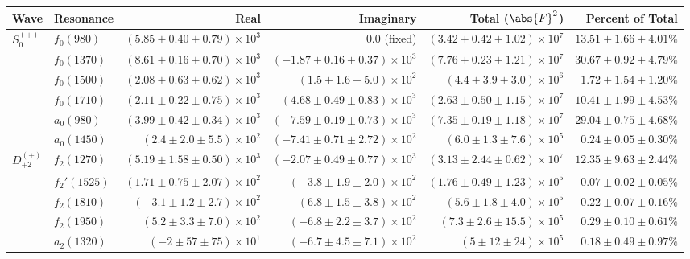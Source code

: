\begin{table}[ht]
    \begin{center}
        \begin{tabular}{llrrrr}\toprule
        Wave & Resonance & Real & Imaginary & Total ($\abs{F}^2$) & Percent of Total \\\midrule
$S_{0}^{(+)}$ & $f_{0}(980)$ & $(5.85 \pm 0.40 \pm 0.79) \times 10^{3}$ & $0.0$ (fixed) & $(3.42 \pm 0.42 \pm 1.02) \times 10^{7}$ & $13.51 \pm 1.66 \pm 4.01 \%$ \\
 & $f_{0}(1370)$ & $(8.61 \pm 0.16 \pm 0.70) \times 10^{3}$ & $(-1.87 \pm 0.16 \pm 0.37) \times 10^{3}$ & $(7.76 \pm 0.23 \pm 1.21) \times 10^{7}$ & $30.67 \pm 0.92 \pm 4.79 \%$ \\
 & $f_{0}(1500)$ & $(2.08 \pm 0.63 \pm 0.62) \times 10^{3}$ & $(1.5 \pm 1.6 \pm 5.0) \times 10^{2}$ & $(4.4 \pm 3.9 \pm 3.0) \times 10^{6}$ & $1.72 \pm 1.54 \pm 1.20 \%$ \\
 & $f_{0}(1710)$ & $(2.11 \pm 0.22 \pm 0.75) \times 10^{3}$ & $(4.68 \pm 0.49 \pm 0.83) \times 10^{3}$ & $(2.63 \pm 0.50 \pm 1.15) \times 10^{7}$ & $10.41 \pm 1.99 \pm 4.53 \%$ \\
 & $a_{0}(980)$ & $(3.99 \pm 0.42 \pm 0.34) \times 10^{3}$ & $(-7.59 \pm 0.19 \pm 0.73) \times 10^{3}$ & $(7.35 \pm 0.19 \pm 1.18) \times 10^{7}$ & $29.04 \pm 0.75 \pm 4.68 \%$ \\
 & $a_{0}(1450)$ & $(2.4 \pm 2.0 \pm 5.5) \times 10^{2}$ & $(-7.41 \pm 0.71 \pm 2.72) \times 10^{2}$ & $(6.0 \pm 1.3 \pm 7.6) \times 10^{5}$ & $0.24 \pm 0.05 \pm 0.30 \%$ \\
$D_{+2}^{(+)}$ & $f_{2}(1270)$ & $(5.19 \pm 1.58 \pm 0.50) \times 10^{3}$ & $(-2.07 \pm 0.49 \pm 0.77) \times 10^{3}$ & $(3.13 \pm 2.44 \pm 0.62) \times 10^{7}$ & $12.35 \pm 9.63 \pm 2.44 \%$ \\
 & $f_{2}'(1525)$ & $(1.71 \pm 0.75 \pm 2.07) \times 10^{2}$ & $(-3.8 \pm 1.9 \pm 2.0) \times 10^{2}$ & $(1.76 \pm 0.49 \pm 1.23) \times 10^{5}$ & $0.07 \pm 0.02 \pm 0.05 \%$ \\
 & $f_{2}(1810)$ & $(-3.1 \pm 1.2 \pm 2.7) \times 10^{2}$ & $(6.8 \pm 1.5 \pm 3.8) \times 10^{2}$ & $(5.6 \pm 1.8 \pm 4.0) \times 10^{5}$ & $0.22 \pm 0.07 \pm 0.16 \%$ \\
 & $f_{2}(1950)$ & $(5.2 \pm 3.3 \pm 7.0) \times 10^{2}$ & $(-6.8 \pm 2.2 \pm 3.7) \times 10^{2}$ & $(7.3 \pm 2.6 \pm 15.5) \times 10^{5}$ & $0.29 \pm 0.10 \pm 0.61 \%$ \\
 & $a_{2}(1320)$ & $(-2 \pm 57 \pm 75) \times 10^{1}$ & $(-6.7 \pm 4.5 \pm 7.1) \times 10^{2}$ & $(5 \pm 12 \pm 24) \times 10^{5}$ & $0.18 \pm 0.49 \pm 0.97 \%$ \\

\end{tabular}
\end{center}
\end{table}
